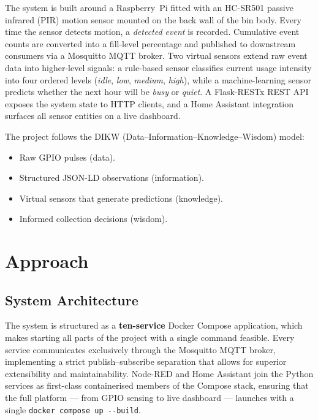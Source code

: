 \documentclass[10pt,a4paper]{article}
\begin{document}
The system is built around a Raspberry~Pi fitted with an HC-SR501 passive infrared (PIR)
motion sensor mounted on the back wall of the bin body. Every time the sensor detects motion, a
\textit{detected event} is recorded. Cumulative event counts are converted into a
fill-level percentage and published to downstream consumers via a Mosquitto MQTT broker.
Two virtual sensors extend raw event data into higher-level signals: a rule-based sensor
classifies current usage intensity into four ordered levels (\textit{idle}, \textit{low},
\textit{medium}, \textit{high}), while a machine-learning sensor predicts whether the
next hour will be \textit{busy} or \textit{quiet}. A Flask-RESTx REST API exposes the
system state to HTTP clients, and a Home Assistant integration surfaces all sensor
entities on a live dashboard.

The project follows the DIKW (Data--Information--Knowledge--Wisdom) model:

\begin{itemize}
\item Raw GPIO pulses (data).
\item Structured JSON-LD observations (information).
\item Virtual sensors that generate predictions (knowledge).
\item Informed collection decisions (wisdom).
\end{itemize}

\section{Approach}

\subsection{System Architecture}

The system is structured as a \textbf{ten-service} Docker Compose application, which makes starting all parts of the project with a single command feasible. Every service communicates exclusively through the Mosquitto MQTT broker, implementing a strict publish--subscribe separation that allows for superior extensibility and maintainability. Node-RED and Home Assistant join the Python services as first-class containerised members of the Compose stack, ensuring that the full platform --- from GPIO sensing to live dashboard --- launches with a single \texttt{docker compose up {-}{-}build}.
\end{document}
